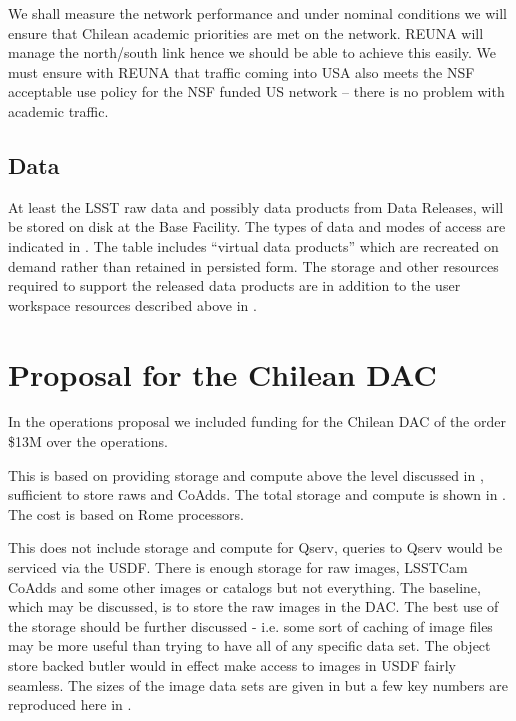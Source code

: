 We shall measure the network performance and under nominal conditions we will ensure that Chilean academic priorities are met on the network.
REUNA will manage the north/south link hence we should be able to achieve this easily.
We must ensure with REUNA that traffic coming into USA also meets the NSF acceptable use policy for the NSF funded US network -- there is no problem with academic traffic.


\subsection{Data}
\label{sec:data}

At least the LSST raw data and possibly data products from Data Releases, will be stored on disk at the Base Facility.
The types of data and modes of access are indicated in .
The table includes ``virtual data products'' which are recreated on demand rather than retained in persisted form.
The storage and other resources required to support the released data products are in addition to the user workspace resources described above in .




\section{Proposal for the Chilean DAC}\label{sec:prop}

In the operations proposal  we included funding for the Chilean DAC of the order \$13M over the operations.

This is based on providing storage and compute above the level discussed in , sufficient to store raws and CoAdds.
The total storage and compute is shown in . The cost is based on Rome processors.


This does not include storage and compute for Qserv, queries to Qserv would be serviced via the USDF.
There is enough storage for raw images, LSSTCam CoAdds and some other images or catalogs but not everything.
The baseline, which may be discussed, is to store the raw images in the DAC.
The best use of the storage should be further discussed - i.e. some sort of caching of image files may be more useful than trying to have all of any specific data set.
The object store backed butler would in effect make access to images in USDF fairly seamless.
The sizes of the image data sets are given in  but a few key numbers are reproduced here in .

